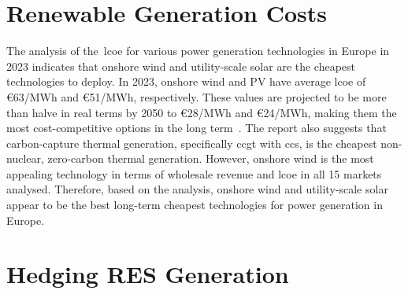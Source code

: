 \section{Renewable Generation Costs}
\label{sec:wind_solar_lcoe}

  The analysis of the~\gls{lcoe} for various power generation technologies in Europe in 2023
  indicates that onshore wind and utility-scale solar are the cheapest technologies to deploy.
  In 2023, onshore wind and PV have average \gls{lcoe} of €63/MWh and €51/MWh, respectively.
  These values are projected to be more than halve in real terms by 2050 to €28/MWh and €24/MWh,
  making them the most cost-competitive options in the long term~\cite{abdullah_europe_2023}.
  The report also suggests that carbon-capture thermal generation,
  specifically \gls{ccgt} with \gls{ccs}, is the cheapest non-nuclear, zero-carbon thermal generation.
  However, onshore wind is the most appealing technology in terms of wholesale revenue and \gls{lcoe}
  in all 15 markets analysed.
  Therefore, based on the analysis, onshore wind and utility-scale solar appear to be the best
  long-term cheapest technologies for power generation in Europe.\\

\section{Hedging RES Generation}
\label{sec:hedging_res}



